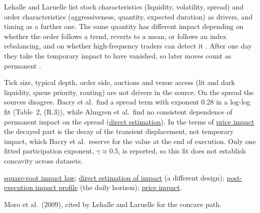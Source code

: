 \begin{qfevidence}
 Lehalle and Laruelle list stock characteristics (liquidity, volatility, spread) and order characteristics (aggressiveness, quantity, expected duration) as drivers, and timing as a further one. The same quantity has different impact depending on whether the order follows a trend, reverts to a mean, or follows an index rebalancing, and on whether high-frequency traders can detect it \citep[chap.~3, sec.~3.2, pp.~203--204 and~206]{alpha-laruelle}. After one day they take the temporary impact to have vanished, so later moves count as permanent \citep[same sec., p.~209]{alpha-laruelle}.

 Tick size, typical depth, order side, auctions and venue access (lit and dark liquidity, queue priority, routing) are not drivers in the source. On the spread the sources disagree. Bacry et al.\ find a spread term with exponent 0.28 in a log-log fit (Table~2, (R.3)), while Almgren et al.\ find no consistent dependence of permanent impact on the spread (\hyperref[meth:almgren-impact-estimation]{direct estimation}). In the terms of \hyperref[def:price-impact]{price impact} the decayed part is the decay of the transient displacement, not temporary impact, which Bacry et al.\ reserve for the value at the end of execution. Only one fitted participation exponent, $\gamma\approx0.5$, is reported, so this fit does not establish concavity across datasets.

 \hyperref[ev:square-root-impact]{square-root impact law}; \hyperref[meth:almgren-impact-estimation]{direct estimation of impact} (a different design); \hyperref[meth:post-execution-impact-profile]{post-execution impact profile} (the daily horizon); \hyperref[def:price-impact]{price impact}.

 Moro et al.\ (2009), cited by Lehalle and Laruelle for the concave path.

\end{qfevidence}

